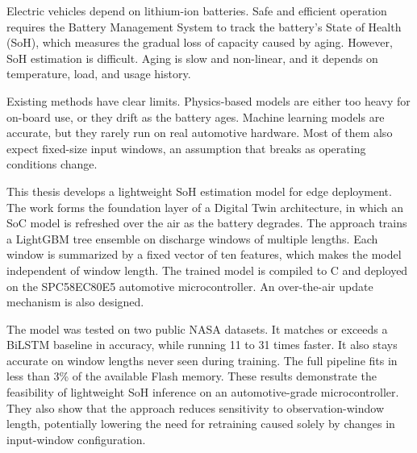 
Electric vehicles depend on lithium-ion batteries. Safe and efficient operation requires the Battery Management System to track the battery's State of Health (SoH), which measures the gradual loss of capacity caused by aging. However, SoH estimation is difficult. Aging is slow and non-linear, and it depends on temperature, load, and usage history.

Existing methods have clear limits. Physics-based models are either too heavy for on-board use, or they drift as the battery ages. Machine learning models are accurate, but they rarely run on real automotive hardware. Most of them also expect fixed-size input windows, an assumption that breaks as operating conditions change.

This thesis develops a lightweight SoH estimation model for edge deployment. The work forms the foundation layer of a Digital Twin architecture, in which an SoC model is refreshed over the air as the battery degrades. The approach trains a LightGBM tree ensemble on discharge windows of multiple lengths. Each window is summarized by a fixed vector of ten features, which makes the model independent of window length. The trained model is compiled to C and deployed on the SPC58EC80E5 automotive microcontroller. An over-the-air update mechanism is also designed.

The model was tested on two public NASA datasets. It matches or exceeds a BiLSTM baseline in accuracy, while running 11 to 31 times faster. It also stays accurate on window lengths never seen during training. The full pipeline fits in less than 3\% of the available Flash memory. These results demonstrate the feasibility of lightweight SoH inference on an automotive-grade microcontroller. They also show that the approach reduces sensitivity to observation-window length, potentially lowering the need for retraining caused solely by changes in input-window configuration.
